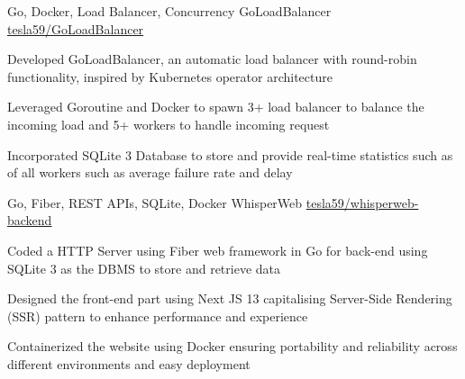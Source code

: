 \documentclass[]{awesome-cv}
\begin{document}
\vspace{-4mm}
\begin{cventries}
    \cventry
    {Go, Docker, Load Balancer, Concurrency}
    {GoLoadBalancer}
    {\href{https://github.com/tesla59/GoLoadBalancer}{tesla59/GoLoadBalancer}}
    {}
    {\begin{cvitems}
            \item Developed GoLoadBalancer, an automatic load balancer with round-robin functionality, inspired by Kubernetes operator architecture
            \item Leveraged Goroutine and Docker to spawn 3+ load balancer to balance the incoming load and 5+ workers to handle incoming request
            \item Incorporated SQLite 3 Database to store and provide real-time statistics such as of all workers such as average failure rate and delay
        \end{cvitems}}

    \vspace{-5mm}
    \cventry
    {Go, Fiber, REST APIs, SQLite, Docker}
    {WhisperWeb}
    {\href{https://github.com/tesla59/whisperweb-backend}{tesla59/whisperweb-backend}}
    {}
    {\begin{cvitems}
            \item Coded a HTTP Server using Fiber web framework in Go for back-end using SQLite 3 as the DBMS to store and retrieve data
            \item Designed the front-end part using Next JS 13 capitalising Server-Side Rendering (SSR) pattern to enhance performance and experience
            \item Containerized the website using Docker ensuring portability and reliability across different environments and easy deployment
        \end{cvitems}}

    \vspace{-5mm}


\end{cventries}
\end{document}
